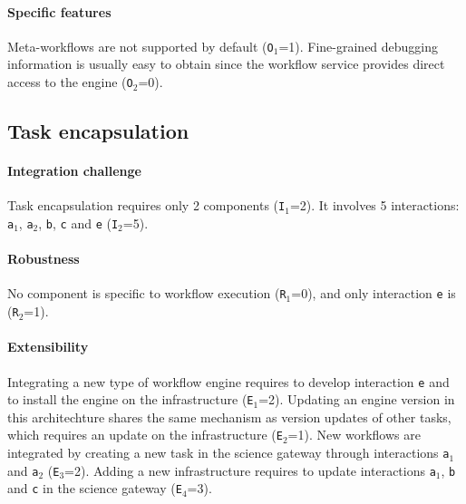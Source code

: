 \documentclass[preprint,3p,twocolumn]{elsarticle}
\newcommand{\closedanswerednote}[6]{}
\begin{document}
\paragraph{Specific features} Meta-workflows are not supported by default
(\texttt{O$_1$}=1). Fine-grained debugging information is usually easy
to obtain since the workflow service provides direct access to the
engine (\texttt{O$_2$}=0).

\subsection{Task encapsulation}

\paragraph{Integration challenge} Task encapsulation requires only 2
components (\texttt{I$_1$}=2).  It involves 5 interactions:
\texttt{a$_1$}, \texttt{a$_2$}, \texttt{b}, \texttt{c} and
\texttt{e} (\texttt{I$_2$}=5).

\paragraph{Robustness} No component is specific to workflow execution
(\texttt{R$_1$}=0), and only interaction \texttt{e} is
(\texttt{R$_2$}=1)\closedanswerednote{sorina}{I understand why this is 1
  (and why interactions c and b are not counted here), but I wonder
  whether we can simply ignore these interactions because they are not
  specific to workflow execution. As far as robustness is concerned,
  the transfers have to be successful anyway...}{Tristan}{We cannot
  just ignore these interactions in the architecture because they are
  required for the system to work. The transfers have to be successful
  but data movements in the workflow will use the same code as data
  movements done in the science gateway, which will make this
  architecture more robust than service for instance. In VIP, for
  instance, the code used in the GASW wrapper to transfer data (c2) is
  completely independent from the ``file transfer'' module in the
  platform (c1), which is detrimental to robustness}{Tristan}{Closed,
  see github issue \#7.}.

\paragraph{Extensibility} Integrating a new type of workflow engine
requires to develop interaction \texttt{e} and to install the engine
on the infrastructure (\texttt{E$_1$}=2). Updating an engine version
in this architechture shares the same mechanism as version updates of
other tasks, which requires an update on the
infrastructure (\texttt{E$_2$}=1).  New workflows are integrated by
creating a new task in the science gateway through interactions
\texttt{a$_1$} and \texttt{a$_2$} (\texttt{E$_3$}=2). Adding a new
infrastructure requires to update interactions \texttt{a$_1$},
\texttt{b} and \texttt{c} in the science gateway (\texttt{E$_4$}=3).
\end{document}
